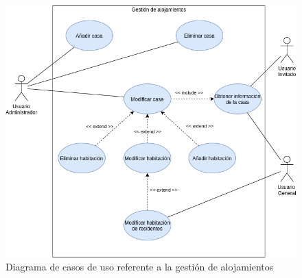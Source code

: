 \begin{figure}[h!]
    \centering
    \includegraphics[width=1\linewidth]{diseno/sistema/CU/alojamiento.png}
    \caption{Diagrama de casos de uso referente a la gestión de alojamientos}
    \label{fig:cu_alojamientos}
\end{figure}

